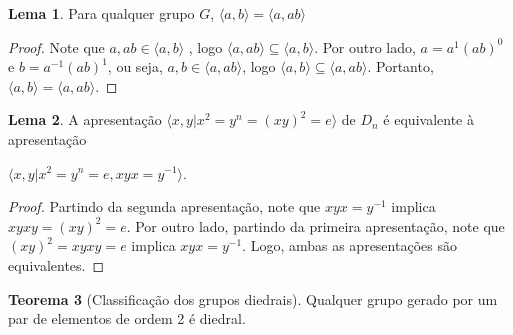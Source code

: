 \documentclass[a4paper,portuguese,11pt,twoside, leqno]{book}
\theoremstyle{definition}
\newtheorem{theorem}{Teorema}[section]
\newtheorem{lemma}[theorem]{Lema}
\begin{document}
	\par\vspace{0.3cm}
	
	\begin{lemma}
		\label{lema geradores}
		Para qualquer grupo $G$, $\langle a,b \rangle = \langle a,ab \rangle$
	\end{lemma}
	
	\begin{proof}
		Note que $a,ab\in\langle a,b \rangle$ , logo $\langle a,ab \rangle\subseteq \langle a,b \rangle$. Por outro lado, $a=a^1(ab)^0$ e $b=a^{-1}(ab)^1$, ou seja, $a,b\in\langle a,ab \rangle$, logo $\langle a,b \rangle \subseteq \langle a,ab \rangle$. Portanto, $\langle a,b \rangle = \langle a,ab \rangle$.
	\end{proof}
	
	\par\vspace{0.3cm}
	
	\begin{lemma}
		\label{lema diedral}
		A apresentação  $\langle x,y | x^2=y^n=(xy)^2=e \rangle$ de $D_n$ é equivalente à apresentação \par $\langle x,y | x^2=y^n=e,xyx=y^{-1} \rangle$.
	\end{lemma}
	
	\begin{proof}
		Partindo da segunda apresentação, note que $xyx=y^{-1}$ implica $xyxy=(xy)^2=e$. Por outro lado, partindo da primeira apresentação, note que $(xy)^2=xyxy=e$ implica $xyx=y^{-1}$. Logo, ambas as apresentações são equivalentes.
	\end{proof}
	
	\par\vspace{0.3cm}
	
	\begin{theorem}[Classificação dos grupos diedrais]
		Qualquer grupo gerado por um par de elementos de ordem 2 é diedral. 
	\end{theorem}
	
\end{document}
